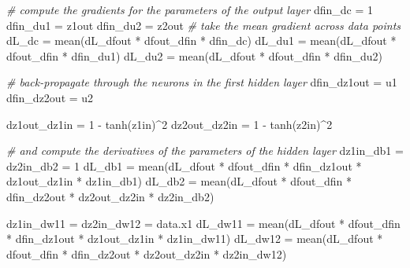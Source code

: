 \documentclass[
  a4paper,
]{article}
\newenvironment{Shaded}{\begin{snugshade}}{\end{snugshade}}
\newcommand{\CommentTok}[1]{\textcolor[rgb]{0.56,0.35,0.01}{\textit{#1}}}
\newcommand{\DecValTok}[1]{\textcolor[rgb]{0.00,0.00,0.81}{#1}}
\newcommand{\FunctionTok}[1]{\textcolor[rgb]{0.00,0.00,0.00}{#1}}
\newcommand{\NormalTok}[1]{#1}
\newcommand{\OtherTok}[1]{\textcolor[rgb]{0.56,0.35,0.01}{#1}}
\newcommand{\SpecialCharTok}[1]{\textcolor[rgb]{0.00,0.00,0.00}{#1}}
\begin{document}
\begin{Shaded}
\begin{Highlighting}[]
  \CommentTok{\# compute the gradients for the parameters of the output layer}
\NormalTok{  dfin\_dc }\OtherTok{=} \DecValTok{1}
\NormalTok{  dfin\_du1 }\OtherTok{=}\NormalTok{ z1out}
\NormalTok{  dfin\_du2 }\OtherTok{=}\NormalTok{ z2out}
  \CommentTok{\# take the mean gradient across data points}
\NormalTok{  dL\_dc }\OtherTok{=} \FunctionTok{mean}\NormalTok{(dL\_dfout }\SpecialCharTok{*}\NormalTok{ dfout\_dfin }\SpecialCharTok{*}\NormalTok{ dfin\_dc)}
\NormalTok{  dL\_du1 }\OtherTok{=} \FunctionTok{mean}\NormalTok{(dL\_dfout }\SpecialCharTok{*}\NormalTok{ dfout\_dfin }\SpecialCharTok{*}\NormalTok{ dfin\_du1)}
\NormalTok{  dL\_du2 }\OtherTok{=} \FunctionTok{mean}\NormalTok{(dL\_dfout }\SpecialCharTok{*}\NormalTok{ dfout\_dfin }\SpecialCharTok{*}\NormalTok{ dfin\_du2)}
  
  \CommentTok{\# back{-}propagate through the neurons in the first hidden layer}
\NormalTok{  dfin\_dz1out }\OtherTok{=}\NormalTok{ u1}
\NormalTok{  dfin\_dz2out }\OtherTok{=}\NormalTok{ u2}
  
\NormalTok{  dz1out\_dz1in }\OtherTok{=} \DecValTok{1} \SpecialCharTok{{-}} \FunctionTok{tanh}\NormalTok{(z1in)}\SpecialCharTok{\^{}}\DecValTok{2}
\NormalTok{  dz2out\_dz2in }\OtherTok{=} \DecValTok{1} \SpecialCharTok{{-}} \FunctionTok{tanh}\NormalTok{(z2in)}\SpecialCharTok{\^{}}\DecValTok{2}
  
  \CommentTok{\# and compute the derivatives of the parameters of the hidden layer}
\NormalTok{  dz1in\_db1 }\OtherTok{=}\NormalTok{ dz2in\_db2 }\OtherTok{=} \DecValTok{1}
\NormalTok{  dL\_db1 }\OtherTok{=} \FunctionTok{mean}\NormalTok{(dL\_dfout }\SpecialCharTok{*}\NormalTok{ dfout\_dfin }\SpecialCharTok{*}\NormalTok{ dfin\_dz1out }\SpecialCharTok{*}\NormalTok{ dz1out\_dz1in }\SpecialCharTok{*}\NormalTok{ dz1in\_db1)}
\NormalTok{  dL\_db2 }\OtherTok{=} \FunctionTok{mean}\NormalTok{(dL\_dfout }\SpecialCharTok{*}\NormalTok{ dfout\_dfin }\SpecialCharTok{*}\NormalTok{ dfin\_dz2out }\SpecialCharTok{*}\NormalTok{ dz2out\_dz2in }\SpecialCharTok{*}\NormalTok{ dz2in\_db2)}
  
\NormalTok{  dz1in\_dw11 }\OtherTok{=}\NormalTok{ dz2in\_dw12 }\OtherTok{=}\NormalTok{ data.x1}
\NormalTok{  dL\_dw11 }\OtherTok{=} \FunctionTok{mean}\NormalTok{(dL\_dfout }\SpecialCharTok{*}\NormalTok{ dfout\_dfin }\SpecialCharTok{*}\NormalTok{ dfin\_dz1out }\SpecialCharTok{*}\NormalTok{ dz1out\_dz1in }\SpecialCharTok{*}\NormalTok{ dz1in\_dw11)}
\NormalTok{  dL\_dw12 }\OtherTok{=} \FunctionTok{mean}\NormalTok{(dL\_dfout }\SpecialCharTok{*}\NormalTok{ dfout\_dfin }\SpecialCharTok{*}\NormalTok{ dfin\_dz2out }\SpecialCharTok{*}\NormalTok{ dz2out\_dz2in }\SpecialCharTok{*}\NormalTok{ dz2in\_dw12)}
  

\end{Highlighting}
\end{Shaded}
\end{document}
